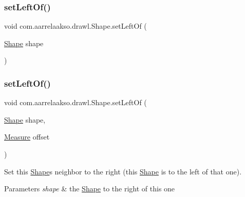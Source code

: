 \subsubsection{\texorpdfstring{set\+Left\+Of()}{setLeftOf()}\hspace{0.1cm}{\footnotesize\ttfamily [1/2]}}
{\footnotesize\ttfamily void com.\+aarrelaakso.\+drawl.\+Shape.\+set\+Left\+Of (\begin{DoxyParamCaption}\item[{\hyperlink{classcom_1_1aarrelaakso_1_1drawl_1_1_shape}{Shape}}]{shape }\end{DoxyParamCaption})}

\mbox{\label{classcom_1_1aarrelaakso_1_1drawl_1_1_shape_aa1f77ee3e24986329b3618b76b2d12be}} 
\subsubsection{\texorpdfstring{set\+Left\+Of()}{setLeftOf()}\hspace{0.1cm}{\footnotesize\ttfamily [2/2]}}
{\footnotesize\ttfamily void com.\+aarrelaakso.\+drawl.\+Shape.\+set\+Left\+Of (\begin{DoxyParamCaption}\item[{\hyperlink{classcom_1_1aarrelaakso_1_1drawl_1_1_shape}{Shape}}]{shape,  }\item[{\hyperlink{classcom_1_1aarrelaakso_1_1drawl_1_1_measure}{Measure}}]{offset }\end{DoxyParamCaption})}



Set this \hyperlink{classcom_1_1aarrelaakso_1_1drawl_1_1_shape}{Shape}\textquotesingle{}s neighbor to the right (this \hyperlink{classcom_1_1aarrelaakso_1_1drawl_1_1_shape}{Shape} is to the left of that one). 


\begin{DoxyParams}{Parameters}
{\em shape} & the \hyperlink{classcom_1_1aarrelaakso_1_1drawl_1_1_shape}{Shape} to the right of this one \\
\hline
\end{DoxyParams}
\mbox{\label{classcom_1_1aarrelaakso_1_1drawl_1_1_shape_a09e1586ce85c1d964cc3b7ce94bc5d4c}} 
